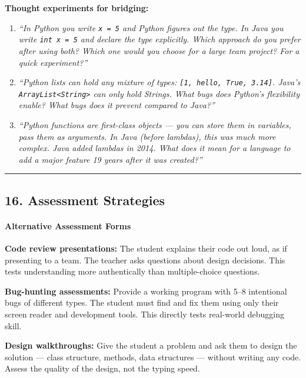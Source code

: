 \documentclass[
  justified,
  openright,
]{tufte-book}
\let\subsubsection\paragraph
\let\paragraph\paragraph
\let\subsubsection\paragraph
\let\paragraph\paragraph
\begin{document}
\textbf{Thought experiments for bridging:}

\begin{enumerate}
\def\labelenumi{\arabic{enumi}.}
\item
  \emph{``In Python you write \texttt{x\ =\ 5} and Python figures out
  the type. In Java you write \texttt{int\ x\ =\ 5} and declare the type
  explicitly. Which approach do you prefer after using both? Which one
  would you choose for a large team project? For a quick experiment?''}
\item
  \emph{``Python lists can hold any mixture of types:
  \texttt{{[}1,\ \textquotesingle{}hello\textquotesingle{},\ True,\ 3.14{]}}.
  Java's \texttt{ArrayList\textless{}String\textgreater{}} can only hold
  Strings. What bugs does Python's flexibility enable? What bugs does it
  prevent compared to Java?''}
\item
  \emph{``Python functions are first-class objects --- you can store
  them in variables, pass them as arguments. In Java (before lambdas),
  this was much more complex. Java added lambdas in 2014. What does it
  mean for a language to add a major feature 19 years after it was
  created?''}
\end{enumerate}

\begin{center}\rule{0.5\linewidth}{0.5pt}\end{center}

\subsection{16. Assessment Strategies}\label{assessment-strategies}

\subsubsection{Alternative Assessment
Forms}\label{alternative-assessment-forms}

\textbf{Code review presentations:} The student explains their code out
loud, as if presenting to a team. The teacher asks questions about
design decisions. This tests understanding more authentically than
multiple-choice questions.

\textbf{Bug-hunting assessments:} Provide a working program with 5--8
intentional bugs of different types. The student must find and fix them
using only their screen reader and development tools. This directly
tests real-world debugging skill.

\textbf{Design walkthroughs:} Give the student a problem and ask them to
design the solution --- class structure, methods, data structures ---
without writing any code. Assess the quality of the design, not the
typing speed.
\end{document}
